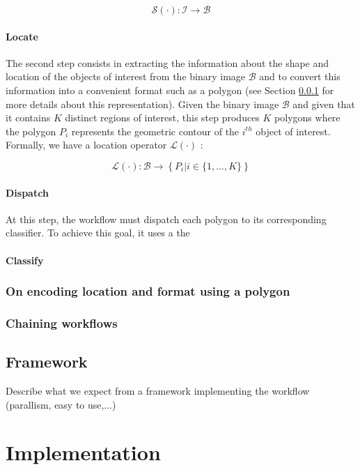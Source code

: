 \[
	\mathcal{S}(\cdot) : \mathcal{I} \rightarrow \mathcal{B}
\]

\paragraph{Locate} The second step consists in extracting the information about the shape and location of the objects of interest from the binary image $\mathcal{B}$ and to convert this information into a convenient format such as a polygon (see Section \ref{sssec:choice_polygon} for more details about this representation). Given the binary image $\mathcal{B}$ and given that it contains $K$ distinct regions of interest, this step produces $K$ polygons where the polygon $P_i$ represents the geometric contour of the $i^{th}$ object of interest. Formally, we have a location operator $\mathcal{L}(\cdot)$ : 

\[
	\mathcal{L}(\cdot) : \mathcal{B} \rightarrow \left\{P_i | i \in \{1,...,K\}\right\}
\]

\paragraph{Dispatch} At this step, the workflow must dispatch each polygon to its corresponding classifier. To achieve this goal, it uses a  the 

\paragraph{Classify}
 

\subsubsection{On encoding location and format using a polygon}
\label{sssec:choice_polygon}

\subsubsection{Chaining workflows}

\subsection{Framework}

Describe what we expect from a framework implementing the workflow (parallism, easy to use,...) 


\section{Implementation}
